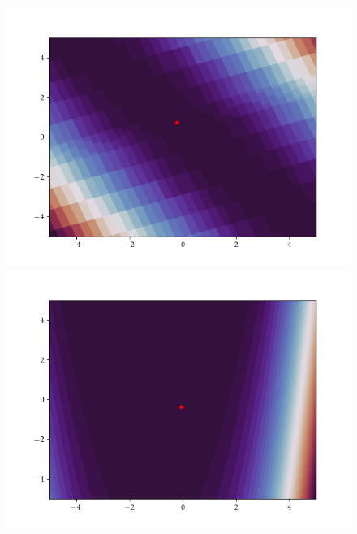\begin{figure}[h]
    \begin{minipage}[b]{0.32\textwidth}
      \includegraphics[trim=2.5cm 1.3cm 2.5cm 1.3cm,clip,width=\textwidth]{Figures/coco/f7.png}
    \end{minipage}
    \hfill
    \begin{minipage}[b]{0.32\textwidth}
      \includegraphics[trim=2.5cm 1.3cm 2.5cm 1.3cm,clip,width=\textwidth]{Figures/coco/f8.png}
    \end{minipage}
    \hfill
    \begin{minipage}[b]{0.32\textwidth}

\end{minipage}
\end{figure}
